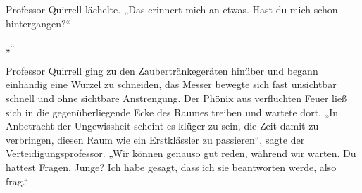 Professor Quirrell lächelte.
„Das erinnert mich an etwas. Hast du mich schon hintergangen?“

„“

Professor Quirrell ging zu den Zaubertränkegeräten hinüber und begann einhändig eine Wurzel zu schneiden, das Messer bewegte sich fast unsichtbar schnell und ohne sichtbare Anstrengung. Der Phönix aus verfluchten Feuer ließ sich in die gegenüberliegende Ecke des Raumes treiben und wartete dort.
„In Anbetracht der Ungewissheit scheint es klüger zu sein, die Zeit damit zu verbringen, diesen Raum wie ein Erstklässler zu passieren“, sagte der Verteidigungsprofessor. „Wir können genauso gut reden, während wir warten. Du hattest Fragen, Junge? Ich habe gesagt, dass ich sie beantworten werde, also frag.“

